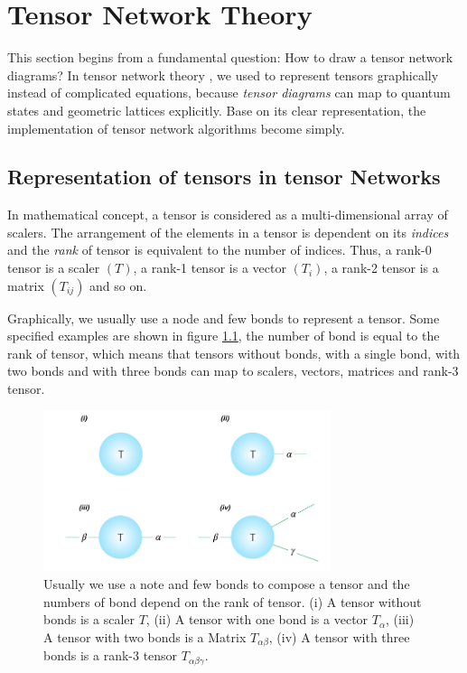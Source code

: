 \chapter{Tensor Network Theory} This section begins from a fundamental question: How to draw a tensor network diagrams? In tensor network theory \cite{jordan_studies_2011} \cite{orus_practical_2014} \cite{bauer_tensor_2011}, we used to represent tensors graphically instead of complicated equations, because \textit{tensor diagrams} can map to quantum states and geometric lattices explicitly. Base on its clear representation, the implementation of  tensor network algorithms become simply. \section{Representation of tensors in tensor Networks}
\label{notations}
In mathematical concept, a tensor is considered as a multi-dimensional array of scalers. The arrangement of the elements in a tensor is dependent on its \textit{indices} and the \textit{rank} of tensor is equivalent to the number of indices. Thus, a rank-0 tensor is a scaler $(T)$, a rank-1 tensor is a vector $(T_{i})$, a rank-2 tensor is a matrix $(T_{ij})$ and so on. 

Graphically, we usually use a node and few bonds to represent a tensor. Some specified examples are shown in figure \ref{fig211}, the number of bond is equal to the rank of tensor, which means that tensors without bonds, with a single bond, with two bonds and with three bonds can map to scalers, vectors, matrices and rank-3 tensor.

\begin{figure}[ht]
	\centering
	\includegraphics[width=0.75\textwidth]{figures/fig211.png}
	\caption[The reprecentation of commen tensors.]{Usually we use a note and few bonds to compose a tensor and the numbers of bond depend on the rank of tensor. (i) A tensor without bonds is a scaler $T$, (ii) A tensor with one bond is a vector $T_{\alpha}$, (iii) A tensor with two bonds is a Matrix $T_{\alpha \beta}$, (iv) A tensor with three bonds is a rank-3 tensor $T_{\alpha \beta \gamma}$.}
	\label{fig211}
\end{figure}


